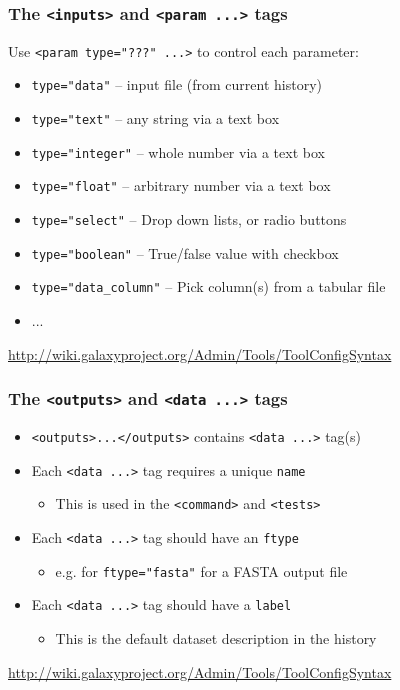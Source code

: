 \documentclass[table]{beamer}
\begin{document}
\begin{frame}
\frametitle{The \texttt{<inputs>} and \texttt{<param ...>} tags}
Use \texttt{<param type="???" ...>} to control each parameter:
\begin{itemize}
\item \texttt{type="data"} -- input file (from current history)
\item \texttt{type="text"} -- any string via a text box
\item \texttt{type="integer"} -- whole number via a text box
\item \texttt{type="float"} -- arbitrary number via a text box
\item \texttt{type="select"} -- Drop down lists, or radio buttons
\item \texttt{type="boolean"} -- True/false value with checkbox
\item \texttt{type="data\_column"} -- Pick column(s) from a tabular file
\item ...
\end{itemize}
{\scriptsize \url{http://wiki.galaxyproject.org/Admin/Tools/ToolConfigSyntax}}
\end{frame}

\begin{frame}
\frametitle{The \texttt{<outputs>} and \texttt{<data ...>} tags}
\begin{itemize}
\item \texttt{<outputs>...</outputs>} contains \texttt{<data ...>} tag(s)
\item Each \texttt{<data ...>} tag requires a unique \texttt{name}
    \begin{itemize}
    \item This is used in the \texttt{<command>} and \texttt{<tests>}
    \end{itemize}
\item Each \texttt{<data ...>} tag should have an \texttt{ftype}
    \begin{itemize}
    \item e.g. for \texttt{ftype="fasta"} for a FASTA output file
    \end{itemize}
\item Each \texttt{<data ...>} tag should have a \texttt{label}
    \begin{itemize}
    \item This is the default dataset description in the history
    \end{itemize}
\end{itemize}
{\scriptsize \url{http://wiki.galaxyproject.org/Admin/Tools/ToolConfigSyntax}}
\end{frame}
\end{document}
